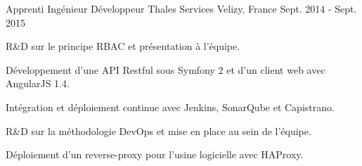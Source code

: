 \begin{cventries}
  \cventry
    {Apprenti Ingénieur Développeur} %
    {Thales Services} %
    {Velizy, France} %
    {Sept. 2014 - Sept. 2015} %
    {
      \begin{cvitems} %
          \item {R\&D sur le principe RBAC et présentation à l'équipe.}
          \item {Développement d'une API Restful sous Symfony 2 et d'un client web avec AngularJS 1.4.}
          \item {Intégration et déploiement continue avec Jenkins, SonarQube et Capistrano.}
          \item {R\&D sur la méthodologie DevOps et mise en place au sein de l'équipe.}
          \item {Déploiement d'un reverse-proxy pour l'usine logicielle avec HAProxy.}
      \end{cvitems}
    }

\end{cventries}
